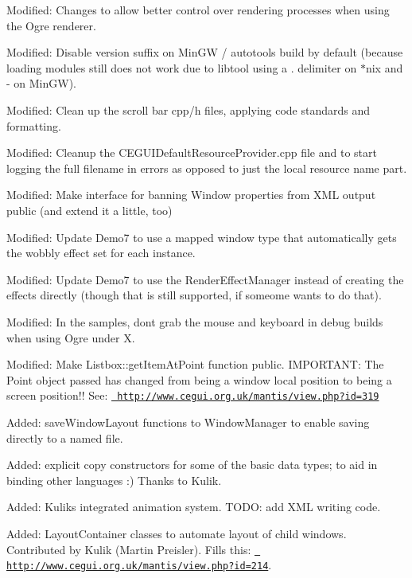 \begin{DoxyItemize}
\item Modified\+: Changes to allow better control over rendering processes when using the Ogre renderer.
\item Modified\+: Disable version suffix on Min\+GW / autotools build by default (because loading modules still does not work due to libtool using a \textquotesingle{}.\textquotesingle{} delimiter on $\ast$nix and \textquotesingle{}-\/\textquotesingle{} on Min\+GW).
\item Modified\+: Clean up the scroll bar cpp/h files, applying code standards and formatting.
\item Modified\+: Cleanup the C\+E\+G\+U\+I\+Default\+Resource\+Provider.\+cpp file and to start logging the full filename in errors as opposed to just the local resource name part.
\item Modified\+: Make interface for banning Window properties from X\+ML output public (and extend it a little, too)
\item Modified\+: Update Demo7 to use a mapped window type that automatically gets the wobbly effect set for each instance.
\item Modified\+: Update Demo7 to use the Render\+Effect\+Manager instead of creating the effects directly (though that is still supported, if someome wants to do that).
\item Modified\+: In the samples, don\textquotesingle{}t grab the mouse and keyboard in debug builds when using Ogre under X.
\item Modified\+: Make Listbox\+::get\+Item\+At\+Point function public. I\+M\+P\+O\+R\+T\+A\+NT\+: The Point object passed has changed from being a window local position to being a screen position!! See\+: \href{http://www.cegui.org.uk/mantis/view.php?id=319}{\texttt{ http\+://www.\+cegui.\+org.\+uk/mantis/view.\+php?id=319}}
\item Added\+: save\+Window\+Layout functions to Window\+Manager to enable saving directly to a named file.
\item Added\+: explicit copy constructors for some of the basic data types; to aid in binding other languages \+:) Thanks to Kulik.
\item Added\+: Kulik\textquotesingle{}s integrated animation system. T\+O\+DO\+: add X\+ML writing code.
\item Added\+: Layout\+Container classes to automate layout of child windows. Contributed by Kulik (Martin Preisler). Fills this\+: \href{http://www.cegui.org.uk/mantis/view.php?id=214}{\texttt{ http\+://www.\+cegui.\+org.\+uk/mantis/view.\+php?id=214}}.

\end{DoxyItemize}
